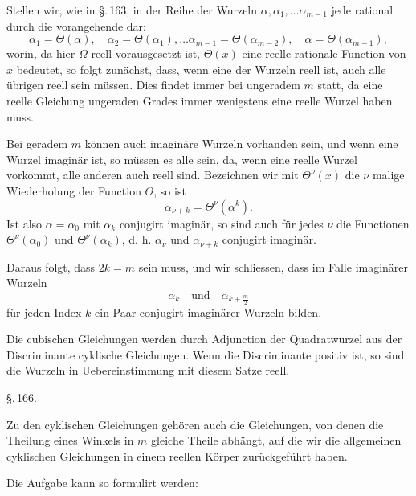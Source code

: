 Stellen wir, wie in \S.\,163, in der Reihe der Wurzeln
$\alpha, \alpha_1, \ldots \alpha_{m-1}$ jede rational durch die vorangehende dar:
\[
\alpha_1 = \Theta(\alpha), \quad \alpha_2 = \Theta(\alpha_1), \ldots \alpha_{m-1} = \Theta(\alpha_{m-2}), \quad \alpha = \Theta(\alpha_{m-1}),
\]
worin, da hier $\Omega$ reell vorausgesetzt ist, $\Theta(x)$ eine reelle rationale Function von $x$ bedeutet, so folgt zunächst, dass, wenn
eine der Wurzeln reell ist, auch alle übrigen reell sein müssen.
Dies findet immer bei ungeradem $m$ statt, da eine reelle Gleichung ungeraden Grades immer wenigstens eine reelle Wurzel
haben muss.

Bei geradem $m$ können auch imaginäre Wurzeln vorhanden
sein, und wenn eine Wurzel imaginär ist, so müssen es alle sein,
da, wenn eine reelle Wurzel vorkommt, alle anderen auch reell
sind. Bezeichnen wir mit $\Theta^{\nu}(x)$ die $\nu$ malige Wiederholung der
Function $\Theta$, so ist
\[
\alpha_{\nu+k} = \Theta^{\nu}(\alpha^k).
\]
Ist also $\alpha = \alpha_0$ mit $\alpha_k$ conjugirt imaginär, so sind auch für
jedes $\nu$ die Functionen $\Theta^{\nu}(\alpha_0)$ und $\Theta^{\nu}(\alpha_k)$, d. h. $\alpha_{\nu}$ und $\alpha_{\nu+k}$
conjugirt imaginär.

Daraus folgt, dass $2k = m$ sein muss, und wir schliessen,
dass im Falle imaginärer Wurzeln
\[
\alpha_k \quad \text{und} \quad \alpha_{k + \frac{m}{2}}
\]
für jeden Index $k$ ein Paar conjugirt imaginärer Wurzeln bilden.

Die cubischen Gleichungen werden durch Adjunction der
Quadratwurzel aus der Discriminante cyklische Gleichungen.
Wenn die Discriminante positiv ist, so sind die Wurzeln in
Uebereinstimmung mit diesem Satze reell.

\begin{center}
\S.\,166.\\
\end{center}

Zu den cyklischen Gleichungen gehören auch die Gleichungen,
von denen die Theilung eines Winkels in $m$ gleiche Theile abhängt, auf die wir die allgemeinen cyklischen Gleichungen in
einem reellen Körper zurückgeführt haben.

Die Aufgabe kann so formulirt werden:

